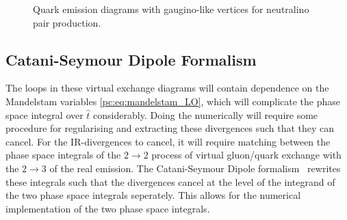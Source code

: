 \documentclass[../main.tex]{subfiles}
\begin{document}
\begin{figure}[ht!]
  \centering
  \begin{subfigure}{0.32\textwidth}
    \centering
    \caption{}
  \end{subfigure}
  \begin{subfigure}{0.32\textwidth}
    \centering
    \caption{}
  \end{subfigure}
  \begin{subfigure}{0.32\textwidth}
    \centering
    \caption{}
  \end{subfigure}
  \begin{subfigure}{0.32\textwidth}
    \centering
    \caption{}
  \end{subfigure}
  \begin{subfigure}{0.32\textwidth}
    \centering
    \caption{}
  \end{subfigure}
  \begin{subfigure}{0.32\textwidth}
    \centering
    \caption{}
  \end{subfigure}
  \caption{Quark emission diagrams with gaugino-like vertices for neutralino pair production.}
  \label{pc:fig:tu_quark_emission}
\end{figure}


\subsection{Catani-Seymour Dipole Formalism}
The loops in these virtual exchange diagrams will contain dependence on the Mandelstam variables \cref{pc:eq:mandelstam_LO}, which will complicate the phase space integral over \(\hat{t}\) considerably.
Doing the numerically will require some procedure for regularising and extracting these divergences such that they can cancel.
For the IR-divergences to cancel, it will require matching between the phase space integrals of the \(2 \to 2\) process of virtual gluon/quark exchange with the \(2 \to 3\) of the real emission.
The Catani-Seymour Dipole formalism~\cite{Catani:1996vz} rewrites these integrals such that the divergences cancel at the level of the integrand of the two phase space integrals seperately.
This allows for the numerical implementation of the two phase space integrals.
\end{document}
